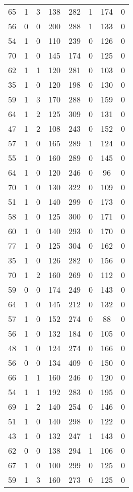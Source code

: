 \documentclass{article}
\begin{document}
\begin{longtable}{*{8}{c}}
65 & 1 & 3 & 138 & 282 & 1 & 174 & 0 \\
56 & 0 & 0 & 200 & 288 & 1 & 133 & 0 \\
54 & 1 & 0 & 110 & 239 & 0 & 126 & 0 \\
70 & 1 & 0 & 145 & 174 & 0 & 125 & 0 \\
62 & 1 & 1 & 120 & 281 & 0 & 103 & 0 \\
35 & 1 & 0 & 120 & 198 & 0 & 130 & 0 \\
59 & 1 & 3 & 170 & 288 & 0 & 159 & 0 \\
64 & 1 & 2 & 125 & 309 & 0 & 131 & 0 \\
47 & 1 & 2 & 108 & 243 & 0 & 152 & 0 \\
57 & 1 & 0 & 165 & 289 & 1 & 124 & 0 \\
55 & 1 & 0 & 160 & 289 & 0 & 145 & 0 \\
64 & 1 & 0 & 120 & 246 & 0 & 96 & 0 \\
70 & 1 & 0 & 130 & 322 & 0 & 109 & 0 \\
51 & 1 & 0 & 140 & 299 & 0 & 173 & 0 \\
58 & 1 & 0 & 125 & 300 & 0 & 171 & 0 \\
60 & 1 & 0 & 140 & 293 & 0 & 170 & 0 \\
77 & 1 & 0 & 125 & 304 & 0 & 162 & 0 \\
35 & 1 & 0 & 126 & 282 & 0 & 156 & 0 \\
70 & 1 & 2 & 160 & 269 & 0 & 112 & 0 \\
59 & 0 & 0 & 174 & 249 & 0 & 143 & 0 \\
64 & 1 & 0 & 145 & 212 & 0 & 132 & 0 \\
57 & 1 & 0 & 152 & 274 & 0 & 88 & 0 \\
56 & 1 & 0 & 132 & 184 & 0 & 105 & 0 \\
48 & 1 & 0 & 124 & 274 & 0 & 166 & 0 \\
56 & 0 & 0 & 134 & 409 & 0 & 150 & 0 \\
66 & 1 & 1 & 160 & 246 & 0 & 120 & 0 \\
54 & 1 & 1 & 192 & 283 & 0 & 195 & 0 \\
69 & 1 & 2 & 140 & 254 & 0 & 146 & 0 \\
51 & 1 & 0 & 140 & 298 & 0 & 122 & 0 \\
43 & 1 & 0 & 132 & 247 & 1 & 143 & 0 \\
62 & 0 & 0 & 138 & 294 & 1 & 106 & 0 \\
67 & 1 & 0 & 100 & 299 & 0 & 125 & 0 \\
59 & 1 & 3 & 160 & 273 & 0 & 125 & 0 \\

\end{longtable}
\end{document}
